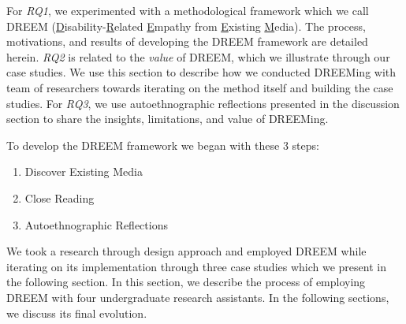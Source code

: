 For \textit{RQ1}, we experimented with a methodological framework which we call DREEM (\underline{D}isability-\underline{R}elated \underline{E}mpathy from \underline{E}xisting \underline{M}edia). The process, motivations, and results of developing the DREEM framework are detailed herein. 
\textit{RQ2} is related to the \textit{value} of DREEM, which we illustrate through our case studies. We use this section to describe how we conducted DREEMing with team of researchers towards iterating on the method itself and building the case studies. For \textit{RQ3}, we use autoethnographic reflections presented in the discussion section to share the insights, limitations, and value of DREEMing. 

To develop the DREEM framework we began with these 3 steps:
\begin{enumerate}
\item Discover Existing Media
\item Close Reading
\item Autoethnographic Reflections
\end{enumerate}

We took a research through design approach \cite{gaverWhatShouldWe2012, zimmermanResearchDesignMethod2007} and employed DREEM while iterating on its implementation through three case studies which we present in the following section. In this section, we describe the process of employing DREEM with four undergraduate research assistants. In the following sections, we discuss its final evolution.

